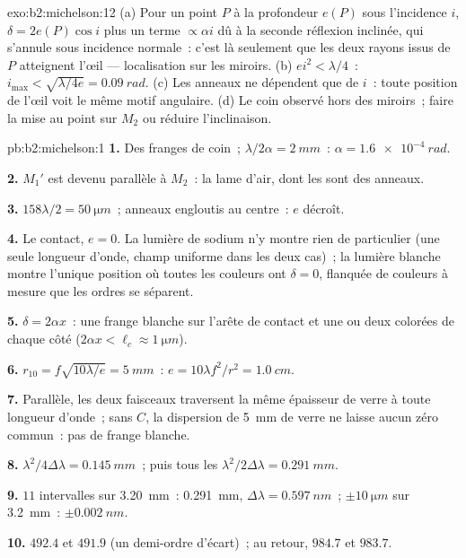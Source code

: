 \begin{solution}{exo:b2:michelson:12}
(a) Pour un point $P$ à la profondeur $e(P)$ sous l'incidence $i$, $\delta = 2e(P)\cos i$
plus un terme $\propto\alpha i$ dû à la seconde réflexion inclinée, qui
s'annule sous incidence normale~: c'est là seulement que les deux rayons issus de $P$ atteignent
l'œil --- localisation sur les miroirs. (b) $ei^2 < \lambda/4$~: $i_{\max} <
\sqrt{\lambda/4e} = \qty{0.09}{rad}$. (c) Les anneaux ne dépendent que de $i$~: toute position
de l'œil voit le même motif angulaire. (d) Le coin observé hors des
miroirs~; faire la mise au point sur $M_2$ ou réduire l'inclinaison.
\end{solution}

\begin{solution}{pb:b2:michelson:1}
\textbf{1.} Des franges de coin~; $\lambda/2\alpha = \qty{2}{mm}$~: $\alpha = \qty{1.6e-4}{rad}$.

\textbf{2.} $M_1'$ est devenu parallèle à $M_2$~: la lame d'air, dont les
 sont des anneaux.

\textbf{3.} $158\lambda/2 = \qty{50}{\micro m}$~; anneaux engloutis au centre~: $e$
décroît.

\textbf{4.} Le contact, $e = 0$. La lumière de sodium n'y montre rien de particulier (une
seule longueur d'onde, champ uniforme dans les deux cas)~; la lumière blanche montre l'unique
position où toutes les couleurs ont $\delta = 0$, flanquée de couleurs à mesure que les
ordres se séparent.

\textbf{5.} $\delta = 2\alpha x$~: une frange blanche sur l'arête de contact et une ou
deux colorées de chaque côté ($2\alpha x < \ell_c \approx \qty{1}{\micro m}$).

\textbf{6.} $r_{10} = f\sqrt{10\lambda/e} = \qty{5}{mm}$~: $e = 10\lambda f^2/r^2 = \qty{1.0}{cm}$.

\textbf{7.} Parallèle, les deux faisceaux traversent la même épaisseur de verre à toute
longueur d'onde~; sans $C$, la dispersion de \qty{5}{mm} de verre ne laisse aucun
zéro commun~: pas de frange blanche.

\textbf{8.} $\lambda^2/4\Delta\lambda = \qty{0.145}{mm}$~; puis tous les $\lambda^2/2\Delta\lambda = \qty{0.291}{mm}$.

\textbf{9.} $11$ intervalles sur \qty{3.20}{mm}~: \qty{0.291}{mm}, $\Delta\lambda = \qty{0.597}{nm}$~;
$\pm\qty{10}{\micro m}$ sur \qty{3.2}{mm}~: $\pm\qty{0.002}{nm}$.

\textbf{10.} $492.4$ et $491.9$ (un demi-ordre d'écart)~; au retour,
$984.7$ et $983.7$.


\end{solution}

